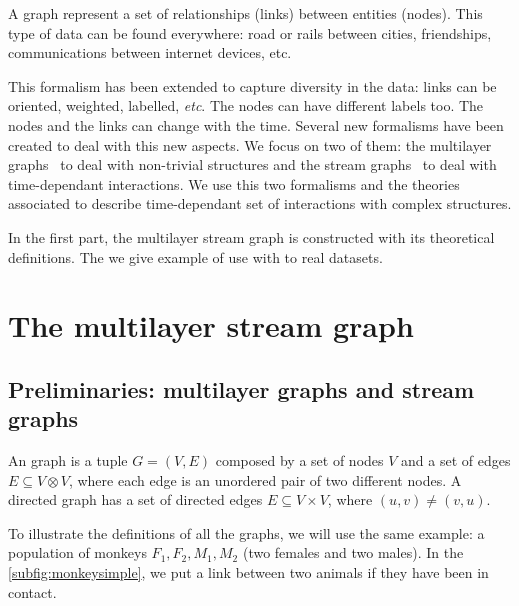 \documentclass{svproc}
\begin{document}
A graph represent a set of relationships (links) between entities (nodes). This type of data can be found everywhere: road or rails between cities, friendships, communications between internet devices, etc.

This formalism has been extended to capture diversity in the data: links can be oriented, weighted, labelled, \textit{etc}. The nodes can have different labels too. The nodes and the links can change with the time. Several new formalisms have been created to deal with this new aspects. We focus on two of them: the multilayer graphs~\cite{mlkiv} to deal with non-trivial structures and the stream graphs~\cite{stream} to deal with time-dependant interactions. We use this two formalisms and the theories associated to describe time-dependant set of interactions with complex structures.

In the first part, the multilayer stream graph is constructed with its theoretical definitions. The we give example of use with to real datasets.


\section{The multilayer stream graph}
%


\subsection{Preliminaries: multilayer graphs and stream graphs}
%
An graph is a tuple $G=(V,E)$ composed by a set of nodes $V$ and a set of edges $E\subseteq V \otimes V$, where each edge is an unordered pair of two different nodes. A directed graph has a set of directed edges $E\subseteq V\times V$, where $(u,v) \neq (v,u)$.

To illustrate the definitions of all the graphs, we will use the same example: a population of monkeys $F_1, F_2, M_1, M_2$ (two females and two males). In the \cref{subfig:monkeysimple}, we put a link between two animals if they have been in contact.
\end{document}
